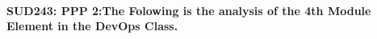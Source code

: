 \documentclass[12pt]{extreport}
\begin{document}
\begin{comment}
\subparagraph{Interpretation of the Box-plots:}
For This Element 




\begin{enumerate}	
	\item The MP Class Box-Plot:
	\begin{enumerate}
		\item MAX = a {} {} {} {} {} {} {} {} UQ = b {} {} {} {} {} {} {} {} Median = c
		\item LQ = d {} {} {} {} {} {} {} {}  MIN =	l {} {} {} {} {} {} {} {}  IQR = e - f = g
	\end{enumerate}
	\item The PSI Class Box-Plot:
	\begin{enumerate}
		\item MAX = a {} {} {} {} {} {} {} {} UQ = b {} {} {} {} {} {} {} {} Median = c
		\item LQ = d {} {} {} {} {} {} {} {}  MIN =	e {} {} {} {} {} {} {} {} IQR = f - g = h	
	\end{enumerate}
	\item The TSI Class Box-Plot:
	\begin{enumerate}
		\item MAX = a {} {} {} {} {} {} {} {} UQ = b {} {} {} {} {} {} {} {} Median = c
		\item LQ = d {} {} {} {} {} {} {} {} MIN = e {} {} {} {} {} {} {} {} IQR = f - g = h	
	\end{enumerate}
\end{enumerate}





\subparagraph{Interpretation of the histogram:}
This Frequency Distribution is (Skeness) with the following descriptive statistics:
\begin{enumerate}
	\item Mean = 
	\item STD = 
	\item Range = a - b = c
	\item IQR = a-b = c 
\end{enumerate}

\end{comment}


\paragraph{\large SUD243: PPP 2:The Folowing is the analysis of the 4th Module Element in the DevOps Class.}  
\end{document}

